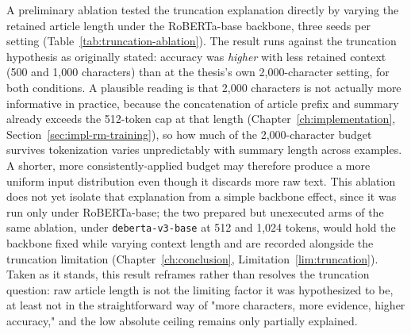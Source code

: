A preliminary ablation tested the truncation explanation directly by varying the
retained article length under the RoBERTa-base backbone, three seeds per setting
(Table~\ref{tab:truncation-ablation}). The result runs against the truncation
hypothesis as originally stated: accuracy was \emph{higher} with less retained
context (500 and 1{,}000 characters) than at the thesis's own 2{,}000-character
setting, for both conditions. A plausible reading is that 2{,}000 characters is
not actually more informative in practice, because the concatenation of article
prefix and summary already exceeds the 512-token cap at that length
(Chapter~\ref{ch:implementation}, Section~\ref{sec:impl-rm-training}), so how much
of the 2{,}000-character budget survives tokenization varies unpredictably with
summary length across examples. A shorter, more consistently-applied budget may
therefore produce a more uniform input distribution even though it discards more
raw text. This ablation does not yet isolate that explanation from a simple
backbone effect, since it was run only under RoBERTa-base; the two prepared but
unexecuted arms of the same ablation, under \texttt{deberta-v3-base} at 512 and
1{,}024 tokens, would hold the backbone fixed while varying context length and
are recorded alongside the truncation limitation (Chapter~\ref{ch:conclusion},
Limitation~\ref{lim:truncation}). Taken as it stands,
this result reframes rather than resolves the truncation question: raw article
length is not the limiting factor it was hypothesized to be, at least not in the
straightforward way of "more characters, more evidence, higher accuracy," and the
low absolute ceiling remains only partially explained.

